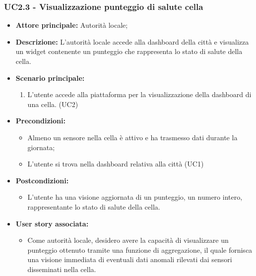 \subsubsection{UC2.3 - Visualizzazione punteggio di salute cella}
\begin{itemize}
    \item \textbf{Attore principale:} Autorità locale;
    \item \textbf{Descrizione:} L'autorità locale accede alla dashboard della città e visualizza un widget contenente un punteggio che rappresenta lo stato di salute della cella.
    \item \textbf{Scenario principale:}
    \begin{enumerate}
      \item L'utente accede alla piattaforma per la visualizzazione della dashboard di una cella. (UC2)
    \end{enumerate}
\item \textbf{Precondizioni:}
    \begin{itemize}
        \item  Almeno un sensore nella cella è attivo e ha trasmesso dati durante la giornata;
        \item L'utente si trova nella dashboard relativa alla città (UC1)
    \end{itemize}
    \item \textbf{Postcondizioni:}
          \begin{itemize}
              \item      L'utente ha una visione aggiornata di un punteggio, un numero intero, rappresentante lo stato di salute della cella.
          \end{itemize}
    \item \textbf{User story associata:}
          \begin{itemize}
              \item Come autorità locale, desidero avere la capacità di visualizzare un punteggio ottenuto tramite una funzione di aggregazione, il quale fornisca una visione immediata di eventuali dati anomali rilevati dai sensori disseminati nella cella.
          \end{itemize}
\end{itemize}